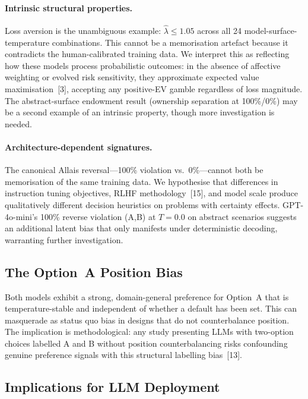 \documentclass{article}
\begin{document}
\paragraph{Intrinsic structural properties.}
Loss aversion is the unambiguous example: $\hat{\lambda} \leq 1.05$
across all 24 model-surface-temperature combinations. This cannot be a
memorisation artefact because it contradicts the human-calibrated training
data. We interpret this as reflecting how these models process probabilistic
outcomes: in the absence of affective weighting or evolved risk sensitivity,
they approximate expected value maximisation~[3], accepting any positive-EV
gamble regardless of loss magnitude. The abstract-surface endowment result
(ownership separation at 100\%/0\%) may be a second example of an intrinsic
property, though more investigation is needed.

\paragraph{Architecture-dependent signatures.}
The canonical Allais reversal---100\% violation vs.\ 0\%---cannot both
be memorisation of the same training data. We hypothesise that differences
in instruction tuning objectives, RLHF methodology~[15], and model scale
produce qualitatively different decision heuristics on problems with
certainty effects. GPT-4o-mini's 100\% reverse violation (A,B) at $T=0.0$ on
abstract scenarios suggests an additional latent bias that only manifests
under deterministic decoding, warranting further investigation.

\subsection{The Option~A Position Bias}

Both models exhibit a strong, domain-general preference for Option~A
that is temperature-stable and independent of whether a default has been
set. This can masquerade as status quo bias in designs that do not
counterbalance position. The implication is methodological: any study
presenting LLMs with two-option choices labelled A and B without position
counterbalancing risks confounding genuine preference signals with this
structural labelling bias~[13].

\subsection{Implications for LLM Deployment}
\end{document}

